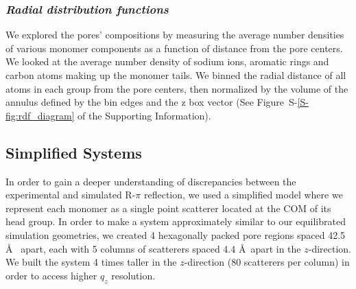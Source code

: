 \documentclass[journal=jpcbfk,manuscript=article]{achemso}
\begin{document}


  
  \subsubsection{\textit{Radial distribution functions}}

  We explored the pores' compositions by measuring the average number densities
  of various monomer components as a function of distance from the pore centers.
  We looked at the average number density of sodium ions, aromatic rings and 
  carbon atoms making up the monomer tails. We binned the radial distance of all
  atoms in each group from the pore centers, then normalized by the volume of the
  annulus defined by the bin edges and the z box vector (See Figure~S-\ref{S-fig:rdf_diagram}
  of the Supporting Information). 

  \subsection{Simplified Systems}\label{method:simple_systems}
  
  In order to gain a deeper understanding of discrepancies between the experimental and
  simulated R-$\pi$ reflection, we used a simplified model where we 
  represent each monomer as a single point scatterer located at the COM
  of its head group. In order to make a system approximately similar to our equilibrated 
  simulation geometries, we created 4 hexagonally packed pore regions spaced 42.5 \AA~
  apart, each with 5 columns of scatterers spaced 4.4 \AA~apart in the $z$-direction. We
  built the system 4 times taller in the $z$-direction (80 scatterers per column) in order
  to access higher $q_z$ resolution.
  
\end{document}
